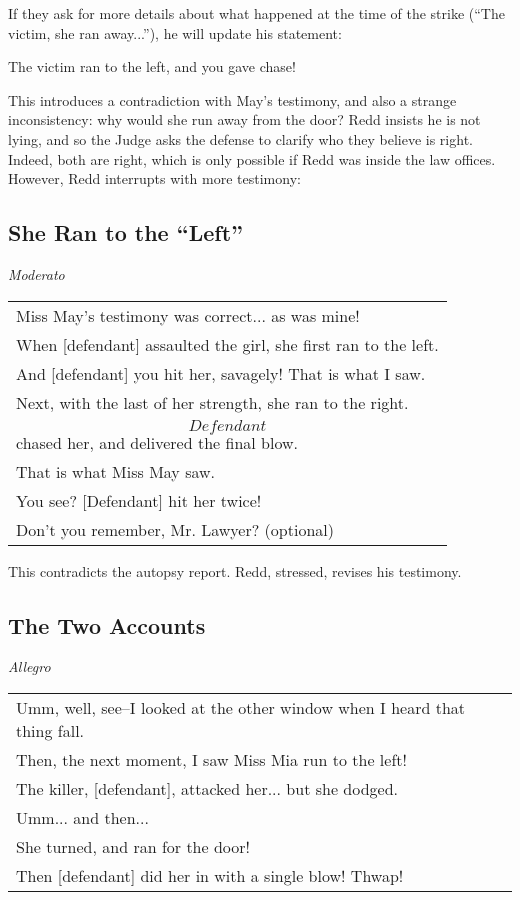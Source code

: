 If they ask for more details about what happened at the time of the strike (``The victim, she ran away...''), he will update his statement:
\begin{center}
The victim ran to the left, and you gave chase!
\end{center}
This introduces a contradiction with May's testimony, and also a strange inconsistency: why would she run away from the door? Redd insists he is not lying,  and so the Judge asks the defense to clarify who they believe is right. Indeed, both are right, which is only possible if Redd was inside the law offices. However, Redd interrupts with more testimony:

\subsection{She Ran to the ``Left''}
\textit{Moderato}\\
\begin{tabular}{p{11cm}}
Miss May's testimony was correct... as was mine!\\
When [defendant] assaulted the girl, she first ran to the left.\\
And [defendant] you hit her, savagely! That is what I saw.\\
Next, with the last of her strength, she ran to the right.\\
\[Defendant\] chased her, and delivered the final blow.\\
That is what Miss May saw.\\
You see? [Defendant] hit her twice!\\
Don't you remember, Mr. Lawyer? (optional)\\
\end{tabular}

This contradicts the autopsy report. Redd, stressed, revises his testimony.

\subsection{The Two Accounts}
\textit{Allegro}\\
\begin{tabular}{p{11cm}}
Umm, well, see--I looked at the other window when I heard that thing fall.\\
Then, the next moment, I saw Miss Mia run to the left!\\
The killer, [defendant], attacked her... but she dodged.\\
Umm... and then...\\
She turned, and ran for the door!\\
Then [defendant] did her in with a single blow! Thwap! \\
\end{tabular}

